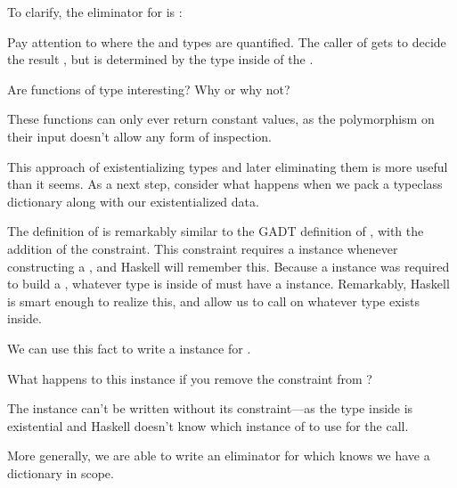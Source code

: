 \documentclass[book.tex]{subfiles}
\begin{document}
To clarify, the eliminator for  is :


Pay attention to where the  and  types are quantified. The caller of
 gets to decide the result , but  is determined by the
type inside of the .

\begin{exercise}
Are functions of type  interesting? Why or why
not?
\end{exercise}
\begin{solution}
  These functions can only ever return constant values, as the polymorphism on
  their input doesn't allow any form of inspection.
\end{solution}

This approach of existentializing types and later eliminating them is more
useful than it seems. As a next step, consider what happens when we
pack a typeclass dictionary along with our existentialized data.


The definition of  is remarkably similar to the GADT definition of
, with the addition of the  constraint. This constraint
requires a  instance whenever constructing a , and Haskell
will remember this. Because a  instance was required to build a
, whatever type is inside of  must have a 
instance. Remarkably, Haskell is smart enough to realize this, and allow us to
call  on whatever type exists inside.

We can use this fact to write a  instance for .


\begin{exercise}
What happens to this instance if you remove the 
constraint from ?
\end{exercise}
\begin{solution}
The  instance can't be written without its 
  constraint---as the type inside  is existential and Haskell
  doesn't know which instance of  to use for the  call.
\end{solution}

More generally, we are able to write an eliminator for  which knows
we have a  dictionary in scope.
\end{document}
